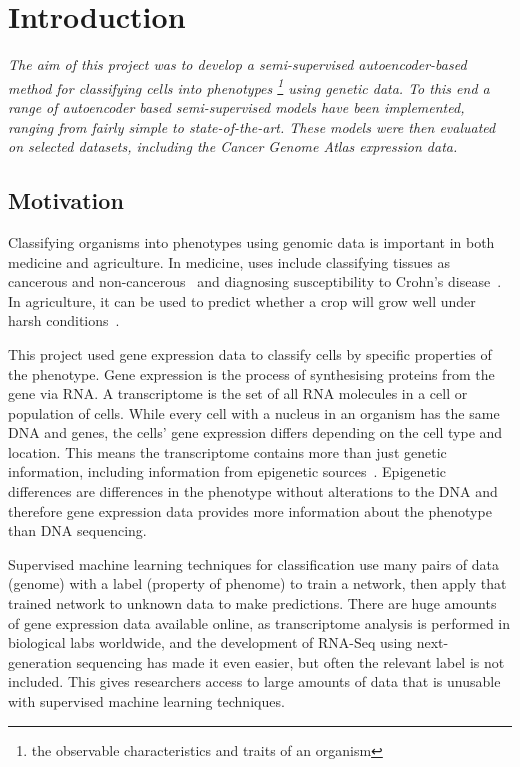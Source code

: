 \chapter{Introduction}

\textit{The aim of this project was to develop a semi-supervised autoencoder-based method for classifying 
cells into phenotypes \footnote{the observable characteristics and traits of an organism} using genetic data. To this end a range 
of autoencoder based semi-supervised models have been implemented, 
ranging from fairly simple to state-of-the-art. These models were then evaluated on selected datasets, including 
the Cancer Genome Atlas expression data.}

\section{Motivation}

Classifying organisms into phenotypes using genomic data is important in both medicine and agriculture. In medicine, uses include 
classifying tissues as cancerous and non-cancerous~\cite{Li2017} and diagnosing susceptibility to Crohn's disease~\cite{doi:10.1002/humu.23280}.
In agriculture, it can be used to predict whether a crop will grow well under harsh conditions~\cite{cimmyt}.

This project used gene expression data to classify cells by specific properties of the phenotype. Gene expression is the process of synthesising 
proteins from the gene via RNA. A transcriptome is the set of all RNA 
molecules in a cell or population of cells. While every cell with a nucleus in an organism has the same DNA and genes, the cells'
gene expression differs depending on the cell type and location. This means the
transcriptome contains more than just genetic information, including information from epigenetic sources~\cite{Gibney2010}. Epigenetic differences are differences
in the phenotype without alterations to the DNA and therefore gene expression data provides more information about 
the phenotype than DNA sequencing.

Supervised machine learning techniques for classification use many pairs of data (genome) with a label
(property of phenome) to train a network, then apply that trained network to unknown data to make predictions. 
There are huge amounts of gene expression data available online, as transcriptome analysis is performed in biological labs worldwide, 
and the development of RNA-Seq using next-generation sequencing has made it even easier, but often the relevant 
label is not included. This gives researchers access to large 
amounts of data that is unusable with supervised machine learning techniques.

